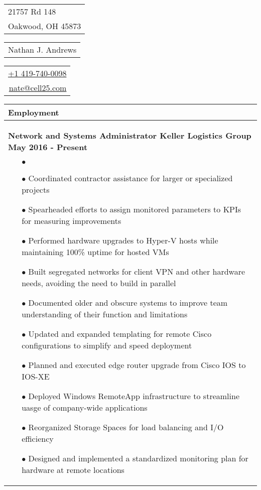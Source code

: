\documentclass{article}
\begin{document}
\sffamily%
{\small\begin{tabular}[c]{l}
  21757 Rd 148 \\
  Oakwood, OH 45873
\end{tabular}}\hfill%
{\Large\bfseries\begin{tabular}[c]{c}
  Nathan J. Andrews
\end{tabular}}\hfill%
{\small\begin{tabular}[c]{r}
  \href{tel:14197400098}{+1 419-740-0098} \\
  \href{mailto:nate@cell25.com}{nate@cell25.com}
\end{tabular}}%

\bigskip

\begin{tabular}{p{\dimexpr\linewidth-2\tabcolsep}}
  \textbf{Employment} \\
  \hline
  {\bfseries Network and Systems Administrator \hfill Keller Logistics Group \qquad \qquad \qquad May 2016 - Present}
	\begin{itemize}
		\item[$\bullet$]
  	\item[$\bullet$]Coordinated contractor assistance for larger or specialized projects
  	\item[$\bullet$]Spearheaded efforts to assign monitored parameters to KPIs for measuring improvements
  	\item[$\bullet$]Performed hardware upgrades to Hyper-V hosts while maintaining 100\% uptime for hosted VMs
  	\item[$\bullet$]Built segregated networks for client VPN and other hardware needs, avoiding the need to build in parallel
  	\item[$\bullet$]Documented older and obscure systems to improve team understanding of their function and limitations
  	\item[$\bullet$]Updated and expanded templating for remote Cisco configurations to simplify and speed deployment
  	\item[$\bullet$]Planned and executed edge router upgrade from Cisco IOS to IOS-XE
  	\item[$\bullet$]Deployed Windows RemoteApp infrastructure to streamline uasge of company-wide applications
  	\item[$\bullet$]Reorganized Storage Spaces for load balancing and I/O efficiency
  	\item[$\bullet$]Designed and implemented a standardized monitoring plan for hardware at remote locations
  \end{itemize}

\end{tabular}
\end{document}
